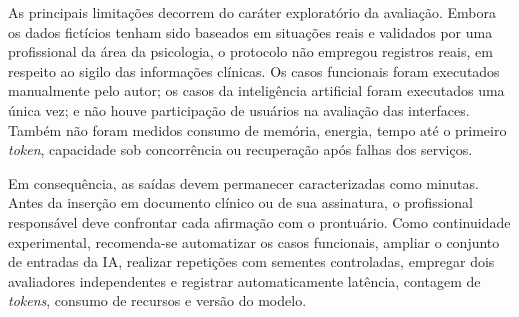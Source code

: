 As principais limitações decorrem do caráter exploratório da avaliação. Embora os dados fictícios tenham sido baseados em situações reais e validados por uma profissional da área da psicologia, o protocolo não empregou registros reais, em respeito ao sigilo das informações clínicas. Os casos funcionais foram executados manualmente pelo autor; os casos da inteligência artificial foram executados uma única vez; e não houve participação de usuários na avaliação das interfaces. Também não foram medidos consumo de memória, energia, tempo até o primeiro \textit{token}, capacidade sob concorrência ou recuperação após falhas dos serviços.

Em consequência, as saídas devem permanecer caracterizadas como minutas. Antes da inserção em documento clínico ou de sua assinatura, o profissional responsável deve confrontar cada afirmação com o prontuário. Como continuidade experimental, recomenda-se automatizar os casos funcionais, ampliar o conjunto de entradas da IA, realizar repetições com sementes controladas, empregar dois avaliadores independentes e registrar automaticamente latência, contagem de \textit{tokens}, consumo de recursos e versão do modelo.

% 
%
